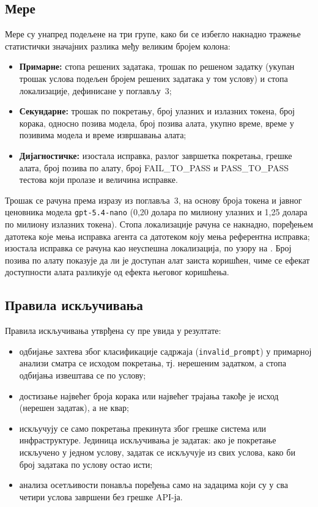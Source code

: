 \documentclass[12pt,a4paper]{report}
\begin{document}
	\subsection{Мере}

	Мере су унапред подељене на три групе, како би се избегло накнадно
	тражење статистички значајних разлика међу великим бројем колона:
	\begin{itemize}
		\item \textbf{Примарне:} стопа решених задатака, трошак по решеном
		задатку (укупан трошак услова подељен бројем решених задатака у том
		услову) и стопа локализације, дефинисане у поглављу~3;
		\item \textbf{Секундарне:} трошак по покретању, број улазних и излазних
		токена, број корака, односно позива модела, број позива алата, укупно време, време у позивима
		модела и време извршавања алата;
		\item \textbf{Дијагностичке:} изостала исправка, разлог завршетка покретања,
		грешке алата, број позива по алату, број FAIL\_TO\_PASS и PASS\_TO\_PASS
		тестова који пролазе и величина исправке.
	\end{itemize}

	Трошак се рачуна према изразу из поглавља~3, на основу броја токена и
	јавног ценовника модела \texttt{gpt-5.4-nano} (0,20 долара по милиону
	улазних и 1,25 долара по милиону излазних токена). Стопа локализације
	рачуна се накнадно, поређењем датотека које мења исправка агента са
	датотеком коју мења референтна исправка; изостала исправка се рачуна као
	неуспешна локализација, по узору на \textcite{xia2025agentless}. Број позива по алату показује да ли је доступан
	алат заиста коришћен, чиме се ефекат доступности алата разликује од
	ефекта његовог коришћења.

	\subsection{Правила искључивања}

	Правила искључивања утврђена су пре увида у резултате:
	\begin{itemize}
		\item одбијање захтева због класификације садржаја
		(\texttt{invalid\_prompt}) у примарној анализи сматра се исходом
		покретања, тј. нерешеним задатком, а стопа одбијања извештава се по
		услову;
		\item достизање највећег броја корака или највећег трајања такође је
		исход (нерешен задатак), а не квар;
		\item искључују се само покретања прекинута због грешке система или
		инфраструктуре. Јединица искључивања је задатак: ако је покретање
		искључено у једном услову, задатак се искључује из свих услова, како би
		број задатака по услову остао исти;
		\item анализа осетљивости понавља поређења само на задацима који су у
		сва четири услова завршени без грешке API-ја.
	\end{itemize}
\end{document}

